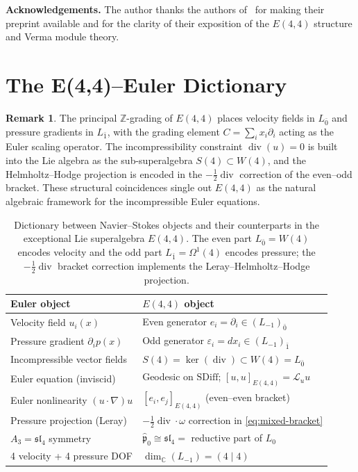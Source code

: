 \documentclass[reqno,10pt]{amsart}
\theoremstyle{definition}
\newtheorem{rem}[subsubsection]{Remark}
\def\Wn{W(4)}
\def\Sn{S(4)}
\def\Cset{{\mathbb{C}}}
\def\divX{{\operatorname{div}}}
\def\phat{\hat{\mathfrak{p}}}
\def\slN{{\mathfrak{sl}}_4}
\begin{document}
\medskip
\noindent\textbf{Acknowledgements.}
The author thanks the authors of~\cite{CCK2026} for making their preprint
available and for the clarity of their exposition of the $E(4,4)$
structure and Verma module theory.

\section{The E(4,4)--Euler Dictionary}
\begin{rem}
    The principal $\mathbb{Z}$-grading of $E(4,4)$ places velocity fields in
    $L_{\bar 0}$ and pressure gradients in $L_{\bar 1}$, with the grading
    element $C = \sum_i x_i\partial_i$ acting as the Euler scaling operator.
    The incompressibility constraint $\operatorname{div}(u)=0$ is built into
    the Lie algebra as the sub-superalgebra $S(4)\subset W(4)$, and the
    Helmholtz--Hodge projection is encoded in the $-\tfrac{1}{2}\operatorname{div}$
    correction of the even--odd bracket.  These structural coincidences single
    out $E(4,4)$ as the natural algebraic framework for the incompressible Euler
    equations.
\end{rem}
\label{sec:dictionary}
% 

\begin{table}[ht]
\centering
\renewcommand{\arraystretch}{1.35}
\begin{tabular}{p{4.5cm} p{9cm}}
\toprule
\textbf{Euler object} & \textbf{$E(4,4)$ object} \\
\midrule
Velocity field $u_i(x)$ &
  Even generator $e_i = \partial_i \in (L_{-1})_{\bar 0}$ \\
Pressure gradient $\partial_i p(x)$ &
  Odd generator $\varepsilon_i = dx_i \in (L_{-1})_{\bar 1}$ \\
Incompressible vector fields &
  $\Sn = \ker(\operatorname{div})\subset\Wn = L_{\bar 0}$ \\
Euler equation (inviscid) &
  Geodesic on $\mathrm{SDiff}$; $[u,u]_{E(4,4)} = \mathcal{L}_u u$ \\
Euler nonlinearity $(u\cdot\nabla)u$ &
  $[e_i, e_j]_{E(4,4)}$ (even--even bracket) \\
Pressure projection (Leray) &
  $-\tfrac 12\divX \cdot\omega$ correction in \eqref{eq:mixed-bracket} \\
$A_3 = \mathfrak{sl}_4$ symmetry &
  $\phat_0 \cong \slN = $ reductive part of $L_0$ \\
4 velocity + 4 pressure DOF &
  $\dim_\Cset(L_{-1}) = (4\mid 4)$ \\
\bottomrule
\end{tabular}
\caption{Dictionary between Navier--Stokes objects and their counterparts
in the exceptional Lie superalgebra $E(4,4)$.  The even part $L_{\bar 0}=W(4)$
encodes velocity and the odd part $L_{\bar 1}=\Omega^1(4)$ encodes pressure;
the $-\tfrac{1}{2}\operatorname{div}$ bracket correction implements the
Leray--Helmholtz--Hodge projection.}
\label{tab:dictionary}
\end{table}
\end{document}
